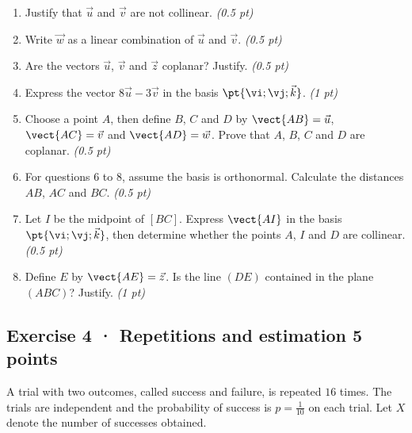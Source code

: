 \begin{enumerate}

\item Justify that $\vec u$ and $\vec v$ are not collinear. \hfill\textit{(0.5 pt)}

\item Write $\vec w$ as a linear combination of $\vec u$ and $\vec v$. \hfill\textit{(0.5 pt)}

\item Are the vectors $\vec u$, $\vec v$ and $\vec z$ coplanar? Justify. \hfill\textit{(0.5 pt)}

\item Express the vector $8\vec u-3\vec v$ in the basis $\pt{\vi;\vj;\vec k}$. \hfill\textit{(1 pt)}

\item Choose a point $A$, then define $B$, $C$ and $D$ by $\vect{AB}=\vec u$, $\vect{AC}=\vec v$ and $\vect{AD}=\vec w$. Prove that $A$, $B$, $C$ and $D$ are coplanar. \hfill\textit{(0.5 pt)}

\item For questions 6 to 8, assume the basis is orthonormal. Calculate the distances $AB$, $AC$ and $BC$. \hfill\textit{(0.5 pt)}

\item Let $I$ be the midpoint of $[BC]$. Express $\vect{AI}$ in the basis $\pt{\vi;\vj;\vec k}$, then determine whether the points $A$, $I$ and $D$ are collinear. \hfill\textit{(0.5 pt)}

\item Define $E$ by $\vect{AE}=\vec z$. Is the line $(DE)$ contained in the plane $(ABC)$? Justify. \hfill\textit{(1 pt)}

\end{enumerate}

\subsection*{Exercise 4 · Repetitions and estimation \hfill 5 points}A trial with two outcomes, called success and failure, is repeated $16$ times. The trials are independent and the probability of success is $p=\frac{1}{10}$ on each trial. Let $X$ denote the number of successes obtained.

